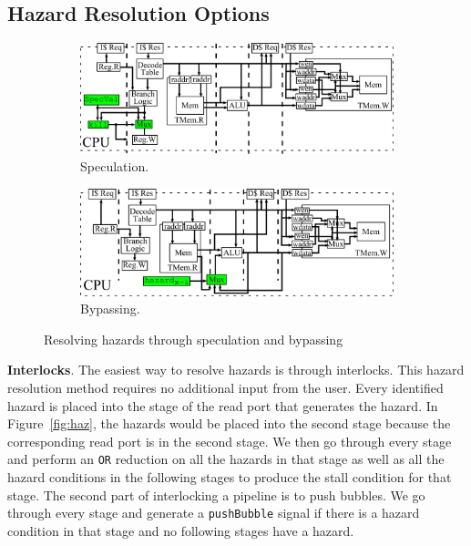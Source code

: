 \subsection{Hazard Resolution Options}
\begin{figure}[htb]
\centering
  \begin{subfigure}[t]{0.8\textwidth}
  \centering
  \includegraphics[width=\textwidth]{figures/pipelinespec.pdf}
  \caption{Speculation.}
  \label{fig:spec}
  \end{subfigure}
  \begin{subfigure}[t]{0.8\textwidth}
  \vspace{20pt}
  \centering
  \includegraphics[width=\textwidth]{figures/pipelinebypass.pdf}
  \caption{Bypassing.}
  \label{fig:bypass}
  \end{subfigure}
\caption{Resolving hazards through speculation and bypassing}
\label{fig:specbyp}
\end{figure}

{\bf Interlocks}. The easiest way to resolve
hazards is through interlocks. This hazard resolution method requires
no additional input from the user. Every identified hazard is placed
into the stage of the read port that generates the hazard. In
Figure~\ref{fig:haz}, the hazards would be placed into the second
stage because the corresponding read port is in the second stage. We
then go through every stage and perform an {\tt OR} reduction on all
the hazards in that stage as well as all the hazard conditions in the
following stages to produce the stall condition for that stage. The
second part of interlocking a pipeline is to push bubbles. We go
through every stage and generate a {\tt pushBubble} signal if there is
a hazard condition in that stage and no following stages have a
hazard.

